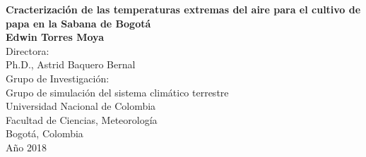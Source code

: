 
\newpage{\pagestyle{empty}\cleardoublepage}

\newpage
\begin{center}
\thispagestyle{empty} \vspace*{0cm} \textbf{\huge Cracterización de las temperaturas extremas del aire para el cultivo de papa en la Sabana de Bogotá}\\[3.0cm]
\Large\textbf{Edwin Torres Moya}\\[3.0cm]
Directora:\\
Ph.D., Astrid Baquero Bernal\\[2.0cm]
Grupo de Investigaci\'{o}n:\\
Grupo de simulación del sistema climático terrestre\\[2.5cm]
Universidad Nacional de Colombia\\
Facultad de Ciencias, Meteorología\\
Bogotá, Colombia\\
A\~{n}o 2018\\
\end{center}
